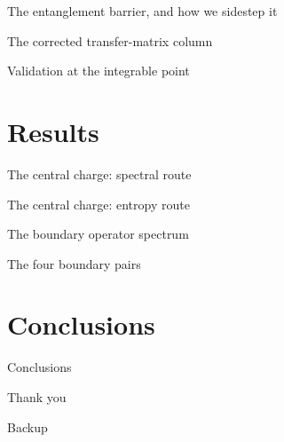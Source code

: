 \documentclass[aspectratio=169, 10pt]{beamer}
\begin{document}
\begin{frame}{The entanglement barrier, and how we sidestep it}
\end{frame}

\begin{frame}{The corrected transfer-matrix column}
\end{frame}

\begin{frame}{Validation at the integrable point}
\end{frame}

\section{Results}

\begin{frame}{The central charge: spectral route}
\end{frame}

\begin{frame}{The central charge: entropy route}
\end{frame}

\begin{frame}{The boundary operator spectrum}
\end{frame}

\begin{frame}{The four boundary pairs}
\end{frame}

\section{Conclusions}

\begin{frame}{Conclusions}
\end{frame}

\begin{frame}
  \centering
  {\Large Thank you}
\end{frame}

\appendix

\begin{frame}{Backup}
\end{frame}
\end{document}
